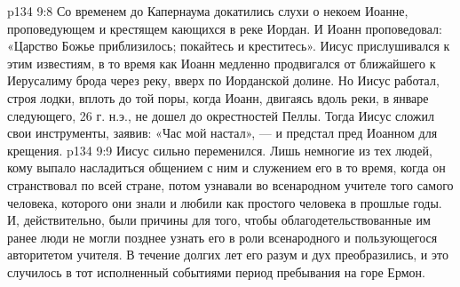 \vs p134 9:8 \pc Со временем до Капернаума докатились слухи о некоем Иоанне, проповедующем и крестящем кающихся в реке Иордан. И Иоанн проповедовал: «Царство Божье приблизилось; покайтесь и креститесь». Иисус прислушивался к этим известиям, в то время как Иоанн медленно продвигался от ближайшего к Иерусалиму брода через реку, вверх по Иорданской долине. Но Иисус работал, строя лодки, вплоть до той поры, когда Иоанн, двигаясь вдоль реки, в январе следующего, 26 г. н.э., не дошел до окрестностей Пеллы. Тогда Иисус сложил свои инструменты, заявив: «Час мой настал», --- и предстал пред Иоанном для крещения.
\vs p134 9:9 Иисус сильно переменился. Лишь немногие из тех людей, кому выпало насладиться общением с ним и служением его в то время, когда он странствовал по всей стране, потом узнавали во всенародном учителе того самого человека, которого они знали и любили как простого человека в прошлые годы. И, действительно, были причины для того, чтобы облагодетельствованные им ранее люди не могли позднее узнать его в роли всенародного и пользующегося авторитетом учителя. В течение долгих лет его разум и дух преобразились, и это случилось в тот исполненный событиями период пребывания на горе Ермон.
